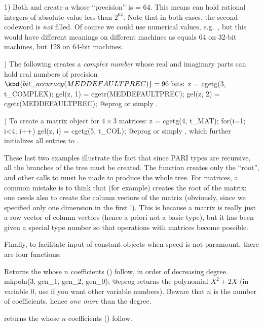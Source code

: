  1) Both  and
 create a  whose ``precision'' is
 = 64. This means  can hold rational
integers of absolute value less than $2^{64}$. Note that in both cases, the
second codeword is \emph{not} filled. Of course we could use numerical
values, e.g.~, but this would have different meanings on
different machines as  equals 64 on 32-bit machines,
but 128 on 64-bit machines.

) The following creates a \emph{complex number} whose real and
imaginary parts can hold real numbers of precision
$\kbd{bit\_accuracy(MEDDEFAULTPREC)} = 96\hbox{ bits:}$
%
\bprog
  z = cgetg(3, t_COMPLEX);
  gel(z, 1) = cgetr(MEDDEFAULTPREC);
  gel(z, 2) = cgetr(MEDDEFAULTPREC);
@eprog\noindent
or simply .

) To create a matrix object for $4\times 3$ matrices:
%
\bprog
  z = cgetg(4, t_MAT);
  for(i=1; i<4; i++) gel(z, i) = cgetg(5, t_COL);
@eprog\noindent
or simply , which further initializes all entries
to .

These last two examples illustrate the fact that since PARI types are
recursive, all the branches of the tree must be created. The function
 creates only the ``root'', and other calls to  must be
made to produce the whole tree. For matrices, a common mistake is to think
that  (for example) creates the root of the
matrix: one needs also to create the column vectors of the matrix (obviously,
since we specified only one dimension in the first !). This is
because a matrix is really just a row vector of column vectors (hence a
priori not a basic type), but it has been given a special type number so that
operations with matrices become possible.

Finally, to facilitate input of constant objects when speed is not paramount,
there are four  functions:

Returns the  whose $n$ coefficients () follow, in order of
decreasing degree.
\bprog
  mkpoln(3, gen_1, gen_2, gen_0);
@eprog
\noindent returns the polynomial $X^2 + 2X$ (in variable $0$, use
 if you want other variable numbers). Beware that $n$ is the
number of coefficients, hence \emph{one more} than the degree.

returns the  whose $n$ coefficients () follow.

